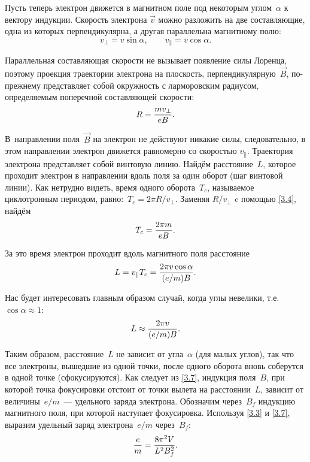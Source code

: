 Пусть теперь электрон движется в магнитном поле под некоторым углом~$\alpha$ к
вектору индукции. Скорость электрона
$\vec{v}$ можно разложить на две составляющие, одна из которых перпендикулярна,
а другая параллельна магнитному полю:
\begin{equation*}
	v_{\bot}=v\sin\alpha,\qquad v_{\parallel}=v\cos\alpha.
\end{equation*}

Параллельная составляющая скорости не вызывает появление силы Лоренца, поэтому
проекция траектории электрона на
плоскость, перпендикулярную~$\vec{B}$, по-прежнему представляет собой окружность
с ларморовским радиусом, определяемым поперечной составляющей скорости:
\begin{equation}
	\eqmark{3.4}
	R =\frac{mv_{\bot}}{eB}.
\end{equation}

В~направлении поля~$\vec{B}$ на электрон не действуют никакие силы,
следовательно, в этом направлении электрон движется равномерно со скоростью
$v_{\parallel}$. Траектория электрона представляет собой винтовую линию. Найдём
расстояние~$L$, которое проходит электрон в направлении вдоль поля за один
оборот (шаг винтовой линии). Как нетрудно видеть, время одного оборота~$T_c$,
называемое циклотронным периодом, равно:~$T_c=2\pi R/v_{\bot}$. Заменяя
$R/v_{\bot}$ c помощью \eqref{3.4}, найдём
\begin{equation}
	\eqmark{3.5}
	T_c =\frac{2\pi m}{eB}.
\end{equation}

За это время электрон проходит вдоль магнитного поля расстояние
\begin{equation}
	\eqmark{3.6}
	L = v_{\parallel}T_c =\frac{2\pi v\cos\alpha}{(e/m)B}.
\end{equation}

Нас будет интересовать главным образом случай, когда углы невелики, т.е.
$\cos\alpha \approx 1$:
\begin{equation}
	\eqmark{3.7}
	L \approx \frac{2\pi v}{(e/m)B}.
\end{equation}

Таким образом, расстояние~$L$ не зависит от угла~$\alpha$ (для малых углов), так
что все электроны, вышедшие из одной точки, после одного оборота вновь соберутся
в одной точке (сфокусируются). Как следует из \eqref{3.7}, индукция поля~$B$,
при которой точка фокусировки отстоит от точки вылета на расстоянии~$L$, зависит
от величины~$e/m$~--- удельного заряда электрона. Обозначим через~$B_f$ индукцию
магнитного поля, при которой наступает фокусировка. Используя \eqref{3.3} и
\eqref{3.7}, выразим удельный заряд электрона~$e/m$ через~$B_f$:
\begin{equation}
	\eqmark{3.8}
\frac{e}{m}=\frac{8\pi^2 V}{L^2B_f^2}.
\end{equation}

